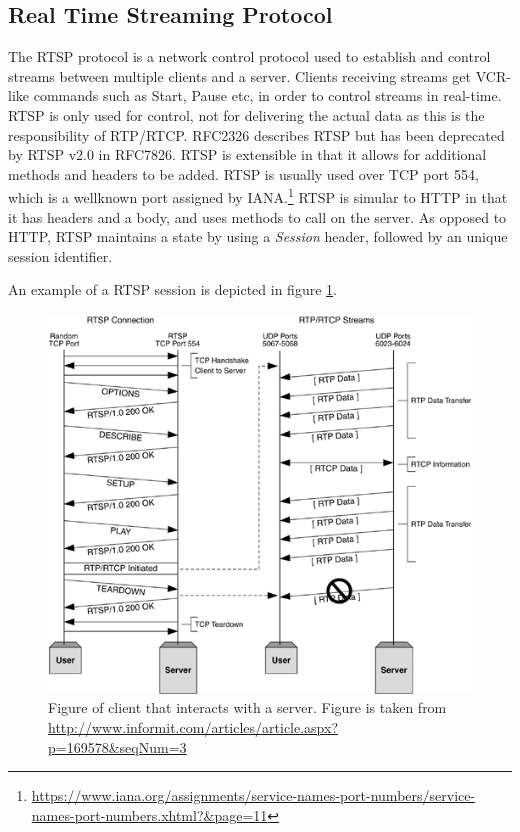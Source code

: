 \subsection{Real Time Streaming Protocol} \label{sec:design:rtsp}
The RTSP protocol is a network control protocol used to establish and control streams between multiple clients and a server. Clients receiving streams get \ac{VCR}-like commands such as Start, Pause etc, in order to control streams in real-time. RTSP is only used for control, not for delivering the actual data as this is the responsibility of RTP/RTCP.
RFC2326 describes RTSP but has been deprecated by RTSP v2.0 in RFC7826. RTSP is extensible in that it allows for additional methods and headers to be added.
RTSP is usually used over TCP port 554, which is a wellknown port assigned by IANA.\footnote{\url{https://www.iana.org/assignments/service-names-port-numbers/service-names-port-numbers.xhtml?&page=11}} RTSP is simular to HTTP in that it has headers and a body, and uses methods to call on the server. As opposed to HTTP, RTSP maintains a state by using a \textit{Session} header, followed by an unique session identifier.

An example of a RTSP session is depicted in figure \ref{fig:design:rtsp:example}.
\begin{figure}[H]
	\centering
	\includegraphics[width=\textwidth]{figures/rtsp_example}
	\caption{Figure of client that interacts with a server. Figure is taken from \url{http://www.informit.com/articles/article.aspx?p=169578&seqNum=3}}
	\label{fig:design:rtsp:example}
\end{figure}

